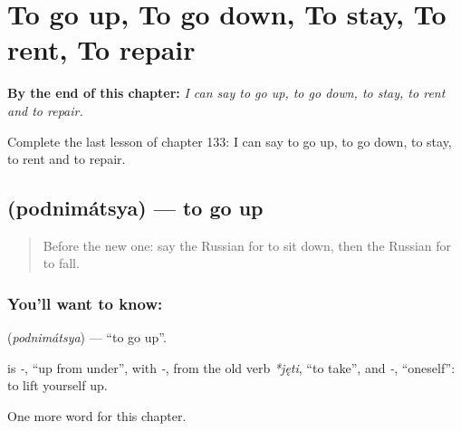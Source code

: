 
\chapter{To go up, To go down, To stay, To rent, To repair}
\label{ch:ru-to-go-up-to-go-down-to-stay-to-rent-to-repair}

\begin{chapteropening}
\textbf{By the end of this chapter:} \emph{I can say to go up, to go down, to stay, to rent and to repair.}

Complete the last lesson of chapter 133: I can say to go up, to go down, to stay, to rent and to repair.
\end{chapteropening}

\section[\texorpdfstring{\ru{подниматься} (podnimátsya)}{подниматься (podnimátsya)}]{ (podnimátsya) — to go up}

\label{lesson:RU-C133-to-go-up}



\begin{quote}
Before the new one: say the Russian for to sit down, then the Russian for to fall.
\end{quote}

\subsection*{You'll want to know: }
\textbf{} (\emph{podnimátsya}) — \textquotedblleft{}to go up\textquotedblright{}.

\begin{cousinweb}
\textbf{} is \emph{-}, \textquotedblleft{}up from under\textquotedblright{}, with \emph{-}, from the old verb \emph{*jęti}, \textquotedblleft{}to take\textquotedblright{}, and \emph{-}, \textquotedblleft{}oneself\textquotedblright{}: to lift yourself up.
\end{cousinweb}

\begin{grammarlens}[title={What you've built}]
One more word for this chapter.
\end{grammarlens}

